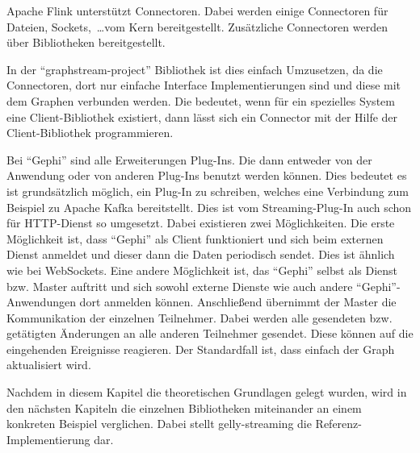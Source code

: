 Apache Flink unterstützt Connectoren. Dabei werden einige Connectoren
für Dateien, Sockets,~\dots vom Kern bereitgestellt. Zusätzliche Connectoren
werden über Bibliotheken bereitgestellt.

In der \enquote{graphstream-project} Bibliothek ist dies einfach Umzusetzen, da
die Connectoren, dort nur einfache Interface Implementierungen sind und diese
mit dem Graphen verbunden werden. Die bedeutet, wenn für ein spezielles
System eine Client-Bibliothek existiert, dann lässt sich ein Connector mit der
Hilfe der Client-Bibliothek programmieren.

Bei \enquote{Gephi} sind alle Erweiterungen Plug-Ins. Die dann entweder von der
Anwendung oder von anderen Plug-Ins benutzt werden können. Dies bedeutet es ist
grundsätzlich möglich, ein Plug-In zu schreiben, welches eine Verbindung zum
Beispiel zu Apache Kafka bereitstellt. Dies ist vom Streaming-Plug-In auch schon
für HTTP-Dienst so umgesetzt. Dabei existieren zwei Möglichkeiten. Die erste
Möglichkeit ist, dass \enquote{Gephi} als Client funktioniert und sich beim
externen Dienst anmeldet und dieser dann die Daten periodisch sendet. Dies ist
ähnlich wie bei WebSockets. Eine andere Möglichkeit ist, das \enquote{Gephi}
selbst als Dienst bzw. Master auftritt und sich sowohl externe Dienste wie auch
andere \enquote{Gephi}-Anwendungen dort anmelden können. Anschließend übernimmt
der Master die Kommunikation der einzelnen Teilnehmer. Dabei werden alle gesendeten
bzw. getätigten Änderungen an alle anderen Teilnehmer gesendet. Diese können
auf die eingehenden Ereignisse reagieren. Der Standardfall ist, dass einfach der
Graph aktualisiert wird.

Nachdem in diesem Kapitel die theoretischen Grundlagen gelegt wurden, wird in den
nächsten Kapiteln die einzelnen Bibliotheken miteinander an einem konkreten Beispiel
verglichen. Dabei stellt gelly-streaming die Referenz-Implementierung dar.
